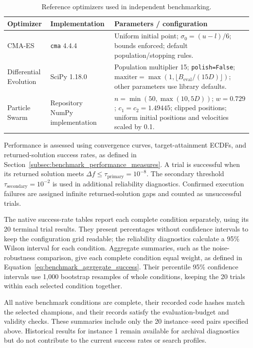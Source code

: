 \begin{table}[htbp]
    \centering
    \caption{Reference optimizers used in independent benchmarking.}
    \label{tab:reference_optimizers}
    \scriptsize
    \setlength{\tabcolsep}{3pt}
    \begin{tabular}{p{}p{}p{}}
        \hline
        Optimizer & Implementation & Parameters / configuration \\
        \hline
        CMA-ES & \texttt{cma} 4.4.4 &
        Uniform initial point; $\sigma_0=(u-l)/6$; bounds enforced;
        default population/stopping rules. \\
        Differential Evolution & SciPy 1.18.0 &
        Population multiplier 15; \texttt{polish=False};
        $\mathrm{maxiter}=\max(1,\lfloor B_{\mathrm{eval}}/(15D)\rfloor)$;
        other parameters use library defaults. \\
        Particle Swarm & Repository NumPy implementation &
        $n=\min(50,\max(10,5D))$; $w=0.729$;
        $c_1=c_2=1.49445$; clipped positions;
        uniform initial positions and velocities scaled by 0.1. \\
        \hline
    \end{tabular}
\end{table}

Performance is assessed using convergence curves, target-attainment
ECDFs, and returned-solution success rates, as defined in
Section~\ref{subsec:benchmark_performance_measures}.
A trial is successful when its returned solution meets
$\Delta f\leq\tau_{\mathrm{primary}}=10^{-8}$.
The secondary threshold $\tau_{\mathrm{secondary}}=10^{-2}$ is used
in additional reliability diagnostics. Confirmed execution failures
are assigned infinite returned-solution gaps and counted as
unsuccessful trials.

The native success-rate tables report each complete condition
separately, using its 20 terminal trial results. They present
percentages without confidence intervals to keep the configuration
grid readable; the reliability diagnostics calculate a 95\% Wilson
interval for each condition. Aggregate summaries, such as the
noise-robustness comparison, give each complete condition equal
weight, as defined in
Equation~\eqref{eq:benchmark_aggregate_success}. Their percentile
95\% confidence intervals use 1,000 bootstrap resamples of whole
conditions, keeping the 20 trials within each selected condition
together.

All native benchmark conditions are complete, their recorded code
hashes match the selected champions, and their records satisfy the
evaluation-budget and validity checks. These summaries include only
the 20 instance--seed pairs specified above. Historical results for
instance 1 remain available for archival diagnostics but do not
contribute to the current success rates or search profiles.

